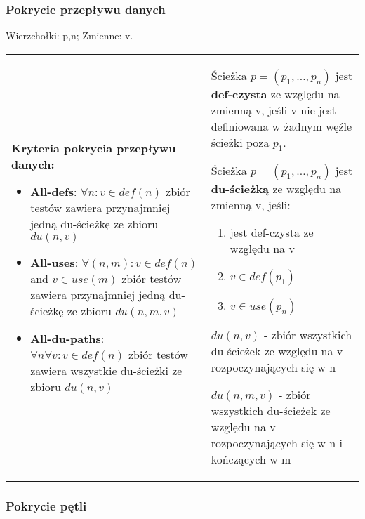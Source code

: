 \documentclass[../main.tex]{subfiles}
\begin{document}
    \subsubsection{Pokrycie przepływu danych}
    Wierzchołki: p,n; Zmienne: v.
    \begin{table}[H]
        \begin{center}
            \begin{tabular}{p{8cm} p{8cm}}
                \textbf{Kryteria pokrycia przepływu danych:}
                \begin{itemize}
                    \item \textbf{All-defs}: $\forall n : v \in def(n)$
                    zbiór testów zawiera przynajmniej jedną du-ścieżkę ze zbioru $du(n, v)$
                    \item \textbf{All-uses}: $\forall (n, m) : v \in def(n)$ and $v \in use(m)$ zbiór testów zawiera przynajmniej jedną
                    du-ścieżkę ze zbioru $du(n, m, v)$
                    \item \textbf{All-du-paths}: $\forall n \forall v: v \in def(n)$
                    zbiór testów zawiera wszystkie du-ścieżki ze zbioru $du(n, v)$
                \end{itemize}
                &
                Ścieżka $p = (p_1 , \dots, p_n)$ jest \textbf{def-czysta} ze względu na zmienną v, jeśli v nie jest
                definiowana w żadnym węźle ścieżki poza $p_1$.

                Ścieżka $p = (p_1 , \dots, p_n)$ jest \textbf{du-ścieżką} ze względu na zmienną v, jeśli:
                \begin{enumerate}
                    \item jest def-czysta ze względu na v
                    \item $v \in def(p_1)$
                    \item $v \in use(p_n)$
                \end{enumerate}

                $du(n, v)$ - zbiór wszystkich du-ścieżek ze względu na v rozpoczynających się w n

                $du(n, m, v)$ - zbiór wszystkich du-ścieżek ze względu na v rozpoczynających się w n i kończących w m
            \end{tabular}
        \end{center}
    \end{table}


    \subsubsection{Pokrycie pętli}
\end{document}
